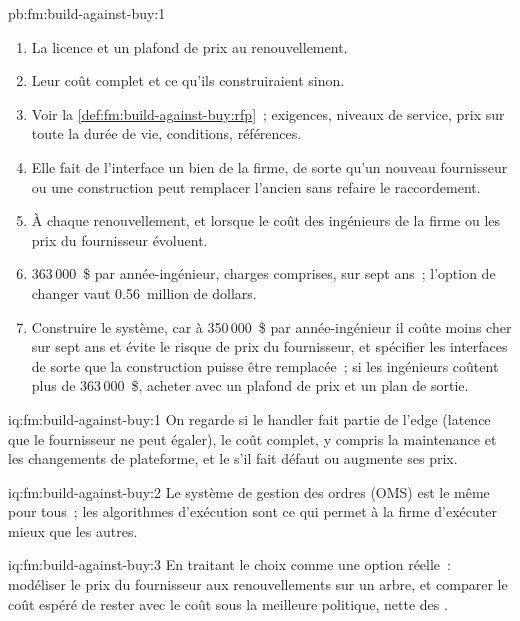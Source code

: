 \begin{solution}{pb:fm:build-against-buy:1}
\begin{enumerate}
\item La licence et un plafond de prix au renouvellement.
\item Leur coût complet et ce qu'ils construiraient sinon.
\item Voir la \cref{def:fm:build-against-buy:rfp}~; exigences, niveaux de service, prix sur toute la durée de vie, conditions, références.
\item Elle fait de l'interface un bien de la firme, de sorte qu'un nouveau fournisseur ou une construction peut remplacer l'ancien sans refaire le raccordement.
\item À chaque renouvellement, et lorsque le coût des ingénieurs de la firme ou les prix du fournisseur évoluent.
\item 363\,000~\$ par année-ingénieur, charges comprises, sur sept ans~; l'option de changer vaut 0.56~million de dollars.
\item Construire le système, car à 350\,000~\$ par année-ingénieur il coûte moins cher sur sept ans et évite le risque de prix du fournisseur, et spécifier les
interfaces de sorte que la construction puisse être remplacée~; si les ingénieurs coûtent plus de 363\,000~\$, acheter avec un plafond de prix et un plan de sortie.
\end{enumerate}
\end{solution}

\begin{solution}{iq:fm:build-against-buy:1}
On regarde si le handler fait partie de l'edge (latence que le fournisseur ne peut égaler), le coût complet, y compris la maintenance et les changements de plateforme, et le  s'il fait défaut ou augmente ses prix.
\end{solution}

\begin{solution}{iq:fm:build-against-buy:2}
Le système de gestion des ordres (OMS) est le même pour tous~; les algorithmes d'exécution sont ce qui permet à la firme d'exécuter mieux que les autres.
\end{solution}

\begin{solution}{iq:fm:build-against-buy:3}
En traitant le choix comme une option réelle~: modéliser le prix du fournisseur aux renouvellements sur un arbre, et comparer le coût espéré de rester avec le coût sous la meilleure
politique, nette des .
\end{solution}

